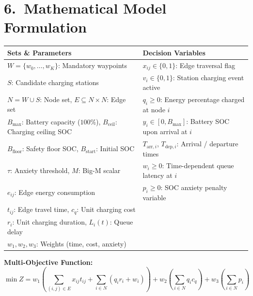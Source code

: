 \documentclass[a0,portrait]{a0poster}
\begin{document}
\begin{minipage}[t][83cm]{0.34\linewidth}

\section*{6.\ Mathematical Model Formulation}
\small
\vspace{0.1cm}
\begin{center}
\renewcommand{\arraystretch}{1.2}
\begin{tabularx}{\linewidth}{@{}X@{\hspace{0.4cm}}|@{\hspace{0.4cm}}X@{}}
\textbf{Sets \& Parameters} & \textbf{Decision Variables} \\
\midrule
$W = \{w_0,\dots,w_K\}$: Mandatory waypoints & $x_{ij} \in \{0, 1\}$: Edge traversal flag \\
$S$: Candidate charging stations & $v_i \in \{0, 1\}$: Station charging event active \\
$N = W \cup S$: Node set, $E \subseteq N \times N$: Edge set & $q_i \geq 0$: Energy percentage charged at node $i$ \\
$B_{\max}$: Battery capacity ($100\%$), $B_{\text{ceil}}$: Charging ceiling SOC  & $y_i \in [0, B_{\max}]$: Battery SOC upon arrival at $i$ \\
$B_{\text{floor}}$: Safety floor SOC, $B_{\text{start}}$: Initial SOC  & $T_{\text{arr}, i}$, $T_{\text{dep}, i}$: Arrival / departure times \\
$\tau$: Anxiety threshold, $M$: Big-M scalar & $w_i \geq 0$: Time-dependent queue latency at $i$ \\
$e_{ij}$: Edge energy consumption & $p_i \geq 0$: SOC anxiety penalty variable \\
$t_{ij}$: Edge travel time, $c_q$: Unit charging cost & \\
$r_i$: Unit charging duration, $L_i(t)$: Queue delay & \\
$w_1, w_2, w_3$: Weights (time, cost, anxiety) & \\
\bottomrule
\end{tabularx}
\end{center}

\vspace{0.3cm}
{\normalsize\textbf{Multi-Objective Function:}}
\[
\min Z = w_1 \!\left( \sum_{(i,j)\in E} x_{ij} t_{ij} + \sum_{i \in N} (q_i r_i + w_i) \right) 
         + w_2 \!\left( \sum_{i \in N} q_i c_q \right) 
         + w_3 \!\left( \sum_{i \in N} p_i \right)
\]


\end{minipage}
\end{document}
